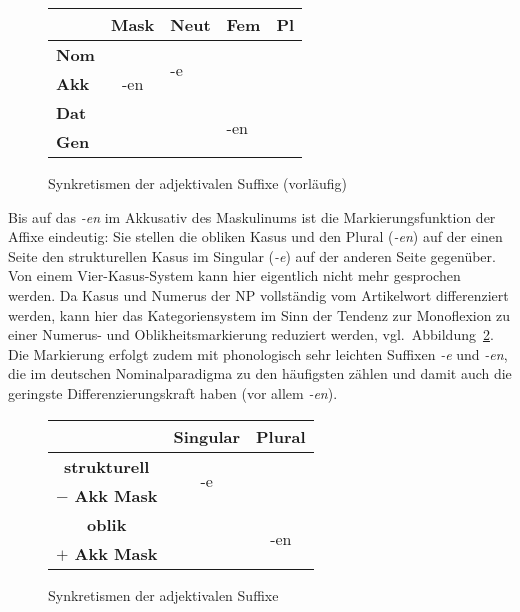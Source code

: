 \begin{figure}[!htbp]
  \centering
  \begin{tabular}{|l|llll|}
    \cline{2-5}
    \multicolumn{1}{c|}{}& \textbf{Mask} & \textbf{Neut} & \textbf{Fem} & \textbf{Pl} \\
    \hline
    \textbf{Nom} && \multirow{2}{*}{-e} & \multicolumn{1}{c|}{} & \\ \cline{2-2}
    \textbf{Akk} & \multicolumn{1}{c|}{-en} && \multicolumn{1}{c|}{} & \\ \cline{2-4}
    \textbf{Dat} &&& \multirow{2}{*}{-en} & \\
    \textbf{Gen} &&&& \\
    \hline
  \end{tabular}
  \caption{Synkretismen der adjektivalen Suffixe (vorläufig)}
  \label{fig:schwacheadj}
\end{figure}

Bis auf das \textit{-en} im Akkusativ des Maskulinums ist die Markierungsfunktion der Affixe eindeutig:
Sie stellen die obliken Kasus und den Plural (\textit{-en}) auf der einen Seite den strukturellen Kasus im Singular (\textit{-e}) auf der anderen Seite gegenüber.
Von einem Vier-Kasus-System kann hier eigentlich nicht mehr gesprochen werden.
Da Kasus und Numerus der NP vollständig vom Artikelwort differenziert werden, kann hier das Kategoriensystem im Sinn der Tendenz zur Monoflexion zu einer Numerus- und Oblikheitsmarkierung reduziert werden, vgl.\ Abbildung~\ref{fig:schwacheadj-r}.
Die Markierung erfolgt zudem mit phonologisch sehr leichten Suffixen \textit{-e} und \textit{-en}, die im deutschen Nominalparadigma zu den häufigsten zählen und damit auch die geringste Differenzierungskraft haben (vor allem \textit{-en}).


\begin{figure}[!htbp]
  \centering
  \begin{tabular}{|l|c|c|}
	\cline{2-3}
	\multicolumn{1}{c|}{} & \multicolumn{1}{c|}{\textbf{Singular}} & \multicolumn{1}{c|}{\textbf{Plural}} \\
	\hline
	\multicolumn{1}{|c|}{\textbf{strukturell}} & \multirow{2}{*}{-e} &  \\	
	\multicolumn{1}{|c|}{\textbf{$-$ Akk Mask}} &  &  \\	
	\cline{1-2}
	\multicolumn{1}{|c|}{\textbf{oblik}} & \multicolumn{1}{c}{} & \multirow{2}{*}{-en} \\	
	\multicolumn{1}{|c|}{\textbf{$+$ Akk Mask}} & \multicolumn{1}{c}{} & \\	
	\hline
  \end{tabular}
  \caption{Synkretismen der adjektivalen Suffixe}
  \label{fig:schwacheadj-r}
\end{figure}


